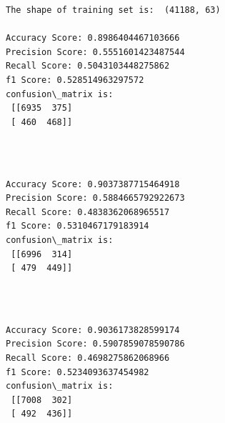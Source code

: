 \documentclass[11pt]{article}
\begin{document}
    \begin{Verbatim}[commandchars=\\\{\}]
The shape of training set is:  (41188, 63) 

Accuracy Score: 0.8986404467103666
Precision Score: 0.5551601423487544
Recall Score: 0.5043103448275862
f1 Score: 0.528514963297572
confusion\_matrix is: 
 [[6935  375]
 [ 460  468]] 


    \end{Verbatim}

   

    \begin{center}
    \end{center}
    { \hspace*{\fill} \\}
    
   
    \begin{Verbatim}[commandchars=\\\{\}]
Accuracy Score: 0.9037387715464918
Precision Score: 0.5884665792922673
Recall Score: 0.4838362068965517
f1 Score: 0.5310467179183914
confusion\_matrix is: 
 [[6996  314]
 [ 479  449]] 


    \end{Verbatim}

   

    \begin{center}
    \end{center}
    { \hspace*{\fill} \\}
    
   

    \begin{Verbatim}[commandchars=\\\{\}]
Accuracy Score: 0.9036173828599174
Precision Score: 0.5907859078590786
Recall Score: 0.4698275862068966
f1 Score: 0.5234093637454982
confusion\_matrix is: 
 [[7008  302]
 [ 492  436]] 


    \end{Verbatim}

    \begin{center}
    \end{center}
    { \hspace*{\fill} \\}
    
\end{document}
